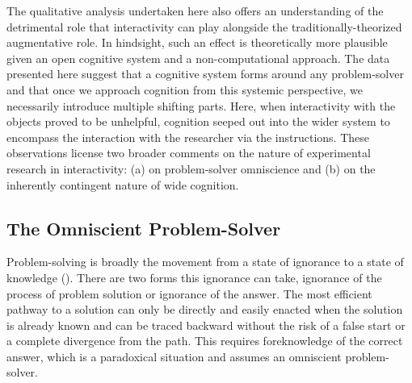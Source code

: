 {{The qualitative analysis undertaken here also offers an understanding of the detrimental role that interactivity can play alongside the traditionally-theorized augmentative role. In hindsight, such an effect is theoretically more plausible given an open cognitive system and a non-computational approach. The data presented here suggest that a cognitive system forms around any problem-solver and that once we approach cognition from this systemic perspective, we necessarily introduce multiple shifting parts. Here, when interactivity with the objects proved to be unhelpful, cognition seeped out into the wider system to encompass the interaction with the researcher via the instructions. These observations license two broader comments on the nature of experimental research in interactivity: (a) on problem-solver omniscience and (b) on the inherently contingent nature of wide cognition.


\subsection{The Omniscient Problem-Solver}

Problem-solving is broadly the movement from a state of ignorance to a state of knowledge (). There are two forms this ignorance can take, ignorance of the process of problem solution or ignorance of the answer. The most efficient pathway to a solution can only be directly and easily enacted when the solution is already known and can be traced backward without the risk of a false start or a complete divergence from the path. This requires foreknowledge of the correct answer, which is a paradoxical situation and assumes an omniscient problem-solver.

}}
